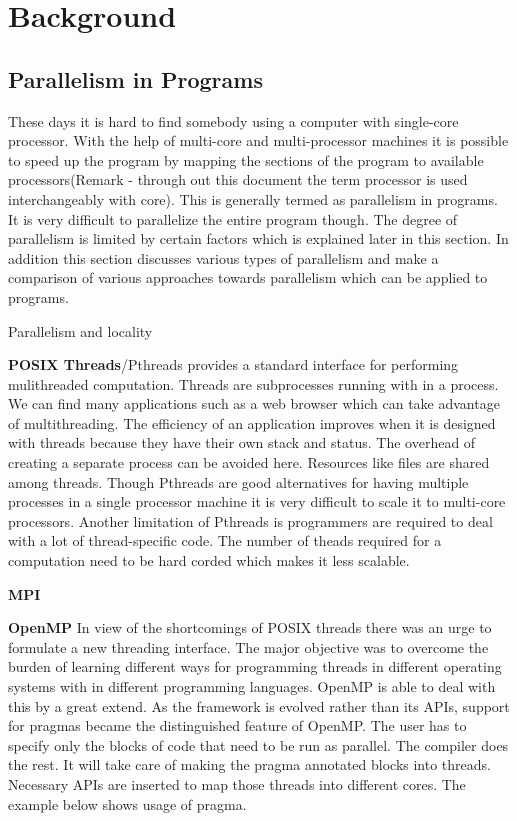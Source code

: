 \documentclass[a4paper,12pt]{book}
\begin{document}
\chapter{Background}

\section{Parallelism in Programs}
These days it is hard to find somebody using a computer with single-core processor.
With the help of multi-core and multi-processor machines it is possible to speed up 
the program by mapping the sections of the program to available processors(Remark - 
through out this document the term processor is used interchangeably with core). This 
is generally termed as parallelism in programs. It is very difficult to parallelize
the entire program though. The degree of parallelism is limited by certain factors which is
explained later in this section. In addition this section discusses various types of parallelism and
make a comparison of various approaches towards parallelism which can be applied to programs.

Parallelism and locality

\textbf{POSIX Threads}/Pthreads provides a standard interface for performing mulithreaded computation. 
Threads are subprocesses running with in a process. 
We can find many applications such as a web browser which can take advantage of multithreading.
The efficiency of an application improves when it is designed with threads because they have their
own stack and status. The overhead of creating a separate process can be avoided here.
Resources like files are shared among threads. Though Pthreads are good alternatives for
having multiple processes in a single processor machine it is very difficult to scale
it to multi-core processors. Another limitation of Pthreads is programmers are required to
deal with a lot of thread-specific code. The number of theads required for a computation
need to be hard corded which makes it less scalable.

\textbf{MPI}

\textbf{OpenMP}
In view of the shortcomings of POSIX threads there was an urge to formulate a new threading
interface. The major objective was to overcome the burden of learning different ways for programming threads in different
operating systems with in different programming languages. OpenMP is able to deal with this
by a great extend. As the framework is evolved rather than its APIs, support for pragmas became the distinguished
feature of OpenMP. The user has to specify only the blocks of code that need to be run
as parallel. The compiler does the rest. It will take care of making the pragma annotated blocks into
threads. Necessary APIs are inserted to map those threads into different cores. The example below
shows usage of pragma.
\end{document}
